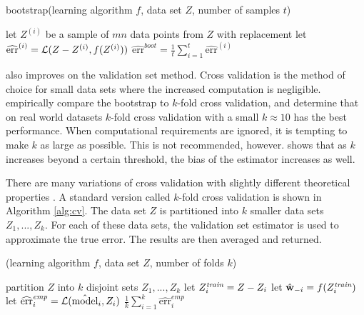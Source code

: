 \documentclass[thesis.tex]{subfiles}
\newcommand{\TO}{{\bfseries to}~}
\newcommand{\model}{\hat{\text{model}}}
\newcommand{\riskhat}{\widehat{\textrm{err}}}
\newcommand{\riskemp}{\widehat{\textrm{err}}^\textit{emp}}
\newcommand{\riskboot}{\widehat{\textrm{err}}^\textit{boot}}
\newcommand{\cv}{\mkprocedure{cv}}
\begin{document}
\begin{algorithm}[t]
    \caption{bootstrap(learning algorithm $f$, data set $Z$, number of samples $t$)}
    \label{alg:boot}
    \vspace{0.1in}
    \begin{algorithmic}[1]
        \For {$i=1$ \TO $t$}
            \State let $Z^{(i)}$ be a sample of $mn$ data points from $Z$ with replacement
            \State let $\riskhat^{(i)} = \Loss(Z-Z^{(i)},f(Z^{(i)}))$
        \EndFor
        \State \Return $\riskboot = \frac 1 t \sum_{i=1}^t \riskhat^{(i)}$
    \end{algorithmic}
\end{algorithm}

 also improves on the validation set method.
Cross validation is the method of choice for small data sets where the increased computation is negligible.
\citet{kohavi1995study} empirically compare the bootstrap to $k$-fold cross validation,
and determine that on real world datasets $k$-fold cross validation with a small $k\approx10$ has the best performance.
When computational requirements are ignored,
it is tempting to make $k$ as large as possible.
This is not recommended, however.
\citet{rao2008dangers} shows that as $k$ increases beyond a certain threshold, 
the bias of the estimator increases as well.

There are many variations of cross validation with slightly different theoretical properties \citep{arlot2010survey}.
A standard version called $k$-fold cross validation is shown in Algorithm \ref{alg:cv}.
The data set $Z$ is partitioned into $k$ smaller data sets $Z_1,...,Z_k$.
For each of these data sets, the validation set estimator is used to approximate the true error.
The results are then averaged and returned.

\begin{algorithm}[t]
    \caption{\cv(learning algorithm $f$, data set $Z$, number of folds $k$)}
    \label{alg:cv}
    \vspace{0.1in}
    \begin{algorithmic}[1]
        \State partition $Z$ into $k$ disjoint sets $Z_1,...,Z_k$
            \State let $Z^\textit{train}_i = Z-Z_i$
            \State let ${\hat{\mathbf w}}_{-i} = f(Z^\textit{train}_i)$ 
            \State let $\riskemp_i = \Loss(\model_i,Z_i)$
        \EndFor
        \State \Return $\frac 1 k \sum_{i=1}^k \riskemp_i$
    \end{algorithmic}
\end{algorithm}
\end{document}
